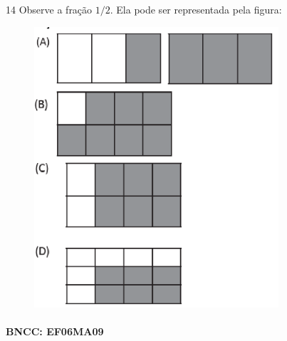 
\num{14} Observe a fração $1/2$. Ela pode ser representada pela figura:

\begin{figure}
\includegraphics[width=3.57531in,height=4.10869in]{./imgSAEB_6_MAT/media/image111.png}
\end{figure}

\paragraph{BNCC: EF06MA09 }


